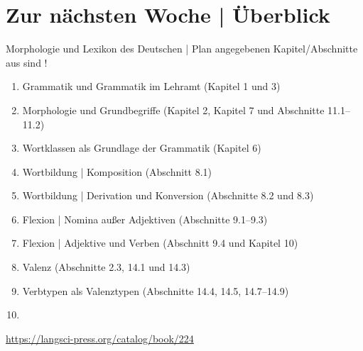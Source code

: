 \section{Zur nächsten Woche | Überblick}

\begin{frame}
  {Morphologie und Lexikon des Deutschen | Plan}
   angegebenen Kapitel\slash Abschnitte aus  sind !\\
  \Halbzeile
  \begin{enumerate}
    \item Grammatik und Grammatik im Lehramt (Kapitel 1 und 3)
    \item Morphologie und Grundbegriffe (Kapitel 2, Kapitel 7 und Abschnitte 11.1--11.2)
    \item Wortklassen als Grundlage der Grammatik (Kapitel 6)
    \item Wortbildung | Komposition (Abschnitt 8.1)
    \item Wortbildung | Derivation und Konversion (Abschnitte 8.2 und 8.3)
    \item Flexion | Nomina außer Adjektiven (Abschnitte 9.1--9.3)
    \item Flexion | Adjektive und Verben (Abschnitt 9.4 und Kapitel 10)
    \item Valenz (Abschnitte 2.3, 14.1 und 14.3)
    \item Verbtypen als Valenztypen (Abschnitte 14.4, 14.5, 14.7--14.9) 
    \item {}
  \end{enumerate}
  \Halbzeile
  \centering 
  \url{https://langsci-press.org/catalog/book/224}
\end{frame}

